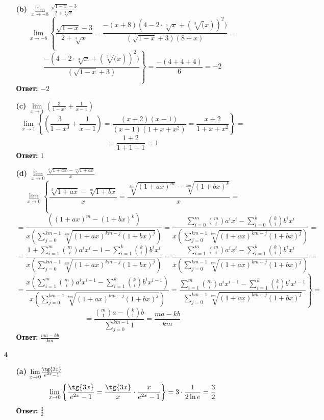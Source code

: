 \documentclass[a4paper]{article}
\renewcommand{\f}[2]{\frac{#1}{#2}}
\newcommand{\s}[2]{\sum\limits_{#1}^{#2}}
\newcommand{\lm}[1]{\underset{#1}{\lim}}
\begin{document}
\begin{enumerate}
\begin{enumerate}
        \item[\textbf{(b)}]$\lm{x \to -8} \f{\sqrt{1-x} - 3}{2 + \sqrt[3]{x}}$
        $$\lm{x \to -8} \left\{  \f{\sqrt{1-x}-3}{2+\sqrt[3]{x}} = \f{-(x+8)(4-2\cdot \sqrt[3]{x} + (\sqrt[3](x))^2)}{(\sqrt{1-x}+3)(8+x)} =  \right.$$
        $$\left. \f{-(4-2\cdot \sqrt[3]{x} + (\sqrt[3](x))^2)}{(\sqrt{1-x}+3)} \right\} = \f{-(4+4+4)}{6} = -2$$
        \textbf{Ответ: } $-2$\\

        \item[\textbf{(c)}]$\lm{x \to 1}(\f{3}{1-x^3} + \f{1}{x-1})$
        $$\lm{x \to 1}\left\{ (\f{3}{1-x^3} + \f{1}{x-1}) = \f{(x+2)(x-1)}{(x-1)(1+x+x^2)} = \f{x+2}{1+x+x^2}\right\} =$$
        $$=  \f{1+2}{1+1+1} = 1$$
        \textbf{Ответ: } $1$\\

        \item[\textbf{(d)}]$\lm{x \to 0}\f{\sqrt[k]{1+ax} - \sqrt[m]{1+bx}}{x}$
        $$\lm{x \to 0}\left\{ \f{\sqrt[k]{1+ax} - \sqrt[m]{1+bx}}{x} = \f{\sqrt[km]{(1+ax)^m}-\sqrt[km]{(1+bx)^k}}{x} = \right.$$
        $$= \f{((1+ax)^m-(1+bx)^k)}{x(\s{j=0}{km-1}\sqrt[km]{(1+ax)^{km-j}(1+bx)^{j}})} = \f{\s{i=0}{m}\binom{m}{i}a^ix^i-\s{i=0}{k}\binom{k}{i}b^ix^i}{x(\s{j=0}{km-1}\sqrt[km]{(1+ax)^{km-j}(1+bx)^{j}})} = $$
        $$= \f{1 + \s{i=1}{m}\binom{m}{i}a^ix^i- 1 - \s{i=1}{k}\binom{k}{i}b^ix^i}{x(\s{j=0}{km-1}\sqrt[km]{(1+ax)^{km-j}(1+bx)^{j}})} = \f{\s{i=1}{m}\binom{m}{i}a^ix^i- \s{i=1}{k}\binom{k}{i}b^ix^i}{x(\s{j=0}{km-1}\sqrt[km]{(1+ax)^{km-j}(1+bx)^{j}})} = $$
        $$\left.= \f{x(\s{i=1}{m}\binom{m}{i}a^ix^{i-1}-\s{i=1}{k}\binom{k}{i}b^ix^{i-1})}{x(\s{j=0}{km-1}\sqrt[km]{(1+ax)^{km-j}(1+bx)^{j}})} = \f{\s{i=1}{m}\binom{m}{i}a^ix^{i-1}-\s{i=1}{k}\binom{k}{i}b^ix^{i-1}}{\s{j=0}{km-1}\sqrt[km]{(1+ax)^{km-j}(1+bx)^{j}}} \right\} = $$
        $$ = \f{\binom{m}{1}a - \binom{k}{1}b}{\s{j=0}{km-1}1} = \f{ma - kb}{km}$$
        \textbf{Ответ: } $\f{ma - kb}{km}$\\
    \end{enumerate}

    \item[\textbf{4}]
    \begin{enumerate}
        \item[\textbf{(a)}]$\lm{x \to 0} \f{\tg{3x}}{e^{2x}-1}$
        $$\lm{x \to 0} \left\{ \f{\tg{3x}}{e^{2x}-1} = \f{\tg{3x}}{x}\cdot \f{x}{e^{2x}-1}\right\} = 3\cdot \f{1}{2 \ln{e}} = \f{3}{2}$$
        \textbf{Ответ: } $\f{3}{2}$\\


\end{enumerate}
\end{enumerate}
\end{document}
